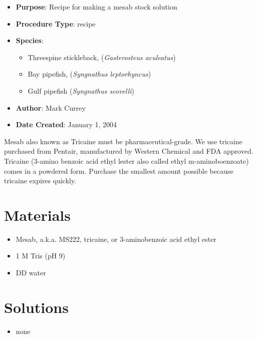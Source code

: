 \documentclass[
  letterpaper,
  DIV=11,
  numbers=noendperiod]{scrreprt}
\providecommand{\tightlist}{%
  \setlength{\itemsep}{0pt}\setlength{\parskip}{0pt}}\usepackage{longtable,booktabs,array}
\begin{document}
\begin{itemize}
\tightlist
\item
  \textbf{Purpose}: Recipe for making a mesab stock solution\\
\item
  \textbf{Procedure Type}: recipe
\item
  \textbf{Species}:

  \begin{itemize}
  \tightlist
  \item
    Threespine stickleback, (\emph{Gasterosteus aculeatus})
  \item
    Bay pipefish, (\emph{Syngnathus leptorhyncus})
  \item
    Gulf pipefish (\emph{Syngnathus scovelli})
  \end{itemize}
\item
  \textbf{Author}: Mark Currey
\item
  \textbf{Date Created}: January 1, 2004
\end{itemize}

Mesab also known as Tricaine must be pharmaceutical-grade. We use
tricaine purchased from Pentair, manufactured by Western Chemical and
FDA approved. Tricaine (3-amino benzoic acid ethyl lester also called
ethyl m-aminoboenzoate) comes in a powdered form. Purchase the smallest
amount possible because tricaine expires quickly.

\hypertarget{materials-63}{%
\section{Materials}\label{materials-63}}

\begin{itemize}
\tightlist
\item
  Mesab, a.k.a. MS222, tricaine, or 3-aminobenzoic acid ethyl ester
\item
  1 M Tris (pH 9)
\item
  DD water
\end{itemize}

\hypertarget{solutions-59}{%
\section{Solutions}\label{solutions-59}}

\begin{itemize}
\tightlist
\item
  none
\end{itemize}
\end{document}
